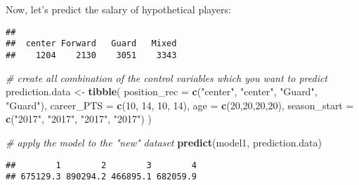\documentclass[
]{book}
\newenvironment{Shaded}{\begin{snugshade}}{\end{snugshade}}
\newcommand{\AttributeTok}[1]{\textcolor[rgb]{0.13,0.29,0.53}{#1}}
\newcommand{\CommentTok}[1]{\textcolor[rgb]{0.56,0.35,0.01}{\textit{#1}}}
\newcommand{\DecValTok}[1]{\textcolor[rgb]{0.00,0.00,0.81}{#1}}
\newcommand{\FunctionTok}[1]{\textcolor[rgb]{0.13,0.29,0.53}{\textbf{#1}}}
\newcommand{\NormalTok}[1]{#1}
\newcommand{\OtherTok}[1]{\textcolor[rgb]{0.56,0.35,0.01}{#1}}
\newcommand{\SpecialCharTok}[1]{\textcolor[rgb]{0.81,0.36,0.00}{\textbf{#1}}}
\newcommand{\StringTok}[1]{\textcolor[rgb]{0.31,0.60,0.02}{#1}}
\begin{document}
Now, let's predict the salary of hypothetical players:

\begin{Shaded}
\end{Shaded}

\begin{verbatim}
## 
##  center Forward   Guard   Mixed 
##    1204    2130    3051    3343
\end{verbatim}

\begin{Shaded}
\begin{Highlighting}[]
\CommentTok{\# create all combination of the control variables which you want to predict}
\NormalTok{prediction.data }\OtherTok{\textless{}{-}} \FunctionTok{tibble}\NormalTok{(}
  \AttributeTok{position\_rec =} \FunctionTok{c}\NormalTok{(}\StringTok{"center"}\NormalTok{, }\StringTok{"center"}\NormalTok{, }\StringTok{"Guard"}\NormalTok{, }\StringTok{"Guard"}\NormalTok{),}
  \AttributeTok{career\_PTS =} \FunctionTok{c}\NormalTok{(}\DecValTok{10}\NormalTok{, }\DecValTok{14}\NormalTok{, }\DecValTok{10}\NormalTok{, }\DecValTok{14}\NormalTok{),}
  \AttributeTok{age =} \FunctionTok{c}\NormalTok{(}\DecValTok{20}\NormalTok{,}\DecValTok{20}\NormalTok{,}\DecValTok{20}\NormalTok{,}\DecValTok{20}\NormalTok{),}
  \AttributeTok{season\_start =} \FunctionTok{c}\NormalTok{(}\StringTok{"2017"}\NormalTok{, }\StringTok{"2017"}\NormalTok{, }\StringTok{"2017"}\NormalTok{, }\StringTok{"2017"}\NormalTok{)}
\NormalTok{)}

\CommentTok{\# apply the model to the "new" dataset}
\FunctionTok{predict}\NormalTok{(model1, }
\NormalTok{        prediction.data)}
\end{Highlighting}
\end{Shaded}

\begin{verbatim}
##        1        2        3        4 
## 675129.3 890294.2 466895.1 682059.9
\end{verbatim}

\begin{Shaded}
\end{Shaded}
\end{document}
